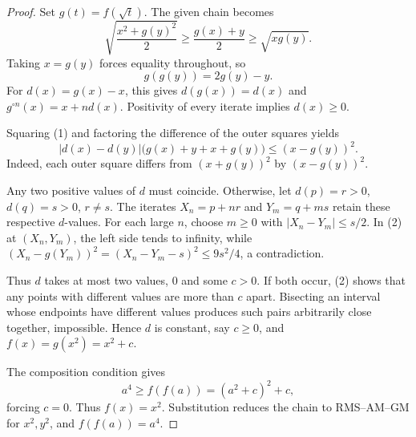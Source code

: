 
\begin{dlsummary}[title={\bfseries Solution 24. The Quadratic Mean Squeeze},breakable]

\begin{proof}
Set $g(t)=f(\sqrt t)$. The given chain becomes
\[
\sqrt{\frac{x^2+g(y)^2}{2}}
\geq\frac{g(x)+y}{2}\geq\sqrt{xg(y)}. \tag{1}
\]
Taking $x=g(y)$ forces equality throughout, so
\[
g(g(y))=2g(y)-y.
\]
For $d(x)=g(x)-x$, this gives $d(g(x))=d(x)$ and
$g^{\circ n}(x)=x+nd(x)$. Positivity of every iterate implies $d(x)\geq0$.

Squaring (1) and factoring the difference of the outer squares yields
\[
|d(x)-d(y)|\bigl(g(x)+y+x+g(y)\bigr)
\leq (x-g(y))^2. \tag{2}
\]
Indeed, each outer square differs from $(x+g(y))^2$ by
$(x-g(y))^2$.

Any two positive values of $d$ must coincide. Otherwise, let
$d(p)=r>0$, $d(q)=s>0$, $r\ne s$. The iterates
$X_n=p+nr$ and $Y_m=q+ms$ retain these respective $d$-values.
For each large $n$, choose $m\geq0$ with $|X_n-Y_m|\leq s/2$.
In (2) at $(X_n,Y_m)$, the left side tends to infinity, while
$(X_n-g(Y_m))^2=(X_n-Y_m-s)^2\leq9s^2/4$, a contradiction.

Thus $d$ takes at most two values, $0$ and some $c>0$. If both occur,
(2) shows that any points with different values are more than $c$
apart. Bisecting an interval whose endpoints have different values
produces such pairs arbitrarily close together, impossible. Hence
$d$ is constant, say $c\geq0$, and $f(x)=g(x^2)=x^2+c$.

The composition condition gives
\[
a^4\geq f(f(a))=(a^2+c)^2+c,
\]
forcing $c=0$. Thus $f(x)=x^2$. Substitution reduces the chain to
RMS--AM--GM for $x^2,y^2$, and $f(f(a))=a^4$.
\end{proof}

\end{dlsummary}